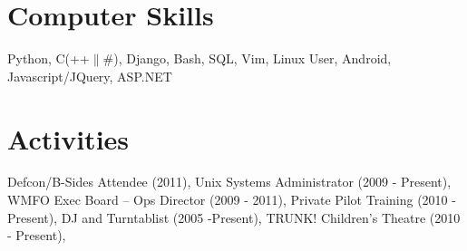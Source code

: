 \documentclass[margin,line]{resume}
\begin{document}
\begin{resume}
	\section{\mysidestyle Computer Skills}
	Python, C(++$\|\#$), Django, Bash, SQL, Vim, Linux User, Android, Javascript/JQuery, ASP.NET
    
    \section{\mysidestyle Activities} 

    Defcon/B-Sides Attendee (2011),
	Unix Systems Administrator (2009 - Present),
	WMFO Exec Board – Ops Director (2009 - 2011),
	Private Pilot Training (2010 - Present),
	DJ and Turntablist (2005 -Present),
	TRUNK! Children's Theatre (2010 - Present),





\end{resume}
\end{document}
